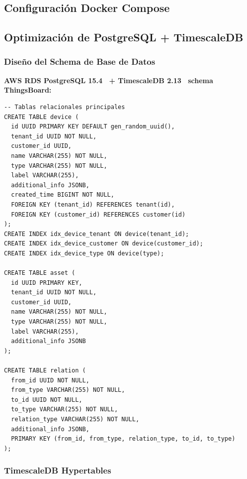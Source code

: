 \subsection{Configuración Docker Compose}
\label{sec:server-tb-docker}


\subsection{Optimización de PostgreSQL + TimescaleDB}
\label{sec:server-postgresql}

\subsubsection{Diseño del Schema de Base de Datos}
\label{sec:server-postgresql-schema}

\textbf{AWS RDS PostgreSQL 15.4~\cite{postgresqlDocumentation2024} + TimescaleDB 2.13~\cite{freedmanTimescaleDBSQLMade2024} schema ThingsBoard:}

\begin{verbatim}
-- Tablas relacionales principales
CREATE TABLE device (
  id UUID PRIMARY KEY DEFAULT gen_random_uuid(),
  tenant_id UUID NOT NULL,
  customer_id UUID,
  name VARCHAR(255) NOT NULL,
  type VARCHAR(255) NOT NULL,
  label VARCHAR(255),
  additional_info JSONB,
  created_time BIGINT NOT NULL,
  FOREIGN KEY (tenant_id) REFERENCES tenant(id),
  FOREIGN KEY (customer_id) REFERENCES customer(id)
);
CREATE INDEX idx_device_tenant ON device(tenant_id);
CREATE INDEX idx_device_customer ON device(customer_id);
CREATE INDEX idx_device_type ON device(type);

CREATE TABLE asset (
  id UUID PRIMARY KEY,
  tenant_id UUID NOT NULL,
  customer_id UUID,
  name VARCHAR(255) NOT NULL,
  type VARCHAR(255) NOT NULL,
  label VARCHAR(255),
  additional_info JSONB
);

CREATE TABLE relation (
  from_id UUID NOT NULL,
  from_type VARCHAR(255) NOT NULL,
  to_id UUID NOT NULL,
  to_type VARCHAR(255) NOT NULL,
  relation_type VARCHAR(255) NOT NULL,
  additional_info JSONB,
  PRIMARY KEY (from_id, from_type, relation_type, to_id, to_type)
);
\end{verbatim}

\subsubsection{TimescaleDB Hypertables}
\label{sec:server-postgresql-hypertables}

